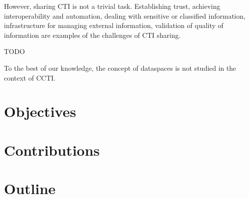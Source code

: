 However, sharing CTI is not a trivial task. Establishing trust, achieving interoperability and automation, dealing with sensitive or classified information, infrastructure for managing external information, validation of quality of information are examples of the challenges of CTI sharing. \cite{johnson_guide_2016}

TODO

To the best of our knowledge, the concept of dataspaces is not studied in the context of CCTI.

\section{Objectives}


\section{Contributions}


\section{Outline}
